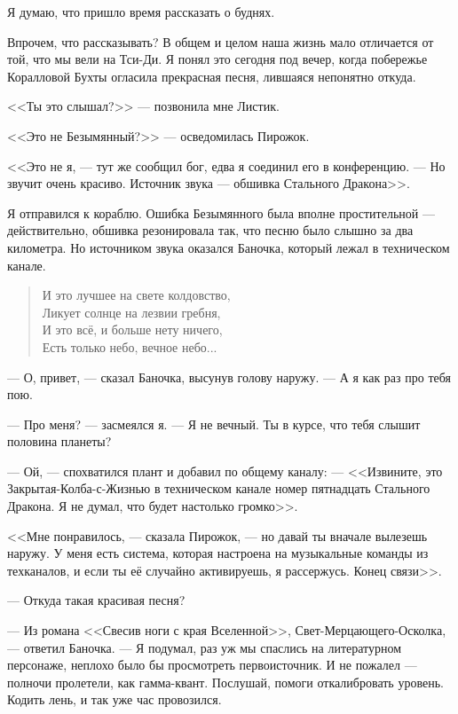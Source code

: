 Я думаю, что пришло время рассказать о буднях.

Впрочем, что рассказывать?
В общем и целом наша жизнь мало отличается от той, что мы вели на Тси-Ди.
Я понял это сегодня под вечер, когда побережье Коралловой Бухты огласила прекрасная песня, лившаяся непонятно откуда.

<<Ты это слышал?>> --- позвонила мне Листик.

<<Это не Безымянный?>> --- осведомилась Пирожок.

<<Это не я, --- тут же сообщил бог, едва я соединил его в конференцию.
--- Но звучит очень красиво.
Источник звука --- обшивка Стального Дракона>>.

Я отправился к кораблю.
Ошибка Безымянного была вполне простительной --- действительно, обшивка резонировала так, что песню было слышно за два километра.
Но источником звука оказался Баночка, который лежал в техническом канале.

\begin{verse}
И это лучшее на свете колдовство,\\
Ликует солнце на лезвии гребня,\\
И это всё, и больше нету ничего,\\
Есть только небо, вечное небо...
\end{verse}

--- О, привет, --- сказал Баночка, высунув голову наружу.
--- А я как раз про тебя пою.

--- Про меня? --- засмеялся я.
--- Я не вечный.
Ты в курсе, что тебя слышит половина планеты?

--- Ой, --- спохватился плант и добавил по общему каналу:
--- <<Извините, это Закрытая-Колба-с-Жизнью в техническом канале номер пятнадцать Стального Дракона.
Я не думал, что будет настолько громко>>.

<<Мне понравилось, --- сказала Пирожок, --- но давай ты вначале вылезешь наружу.
У меня есть система, которая настроена на музыкальные команды из техканалов, и если ты её случайно активируешь, я рассержусь.
Конец связи>>.

--- Откуда такая красивая песня?

--- Из романа <<Свесив ноги с края Вселенной>>, Свет-Мерцающего-Осколка, --- ответил Баночка.
--- Я подумал, раз уж мы спаслись на литературном персонаже, неплохо было бы просмотреть первоисточник.
И не пожалел --- полночи пролетели, как гамма-квант.
Послушай, помоги откалибровать уровень.
Кодить лень, и так уже час провозился.

